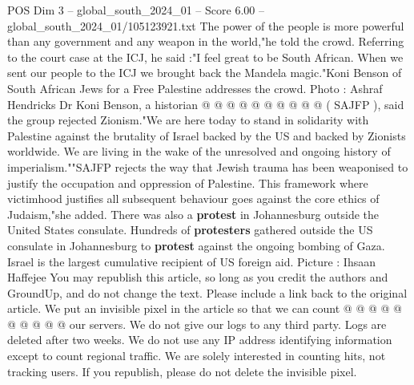 \begin{textsample}{POS Dim 3 – global\_south\_2024\_01 – Score 6.00 – global\_south\_2024\_01/105123921.txt}
The power of the people is more powerful than any government and any weapon in the world,"he told the crowd.
Referring to the court case at the ICJ, he said :"I feel great to be South African.
When we sent our people to the ICJ we brought back the Mandela magic."Koni Benson of South African Jews for a Free Palestine addresses the crowd.
Photo : Ashraf Hendricks Dr Koni Benson, a historian @ @ @ @ @ @ @ @ @ @ ( SAJFP ), said the group rejected Zionism."We are here today to stand in solidarity with Palestine against the brutality of Israel backed by the US and backed by Zionists worldwide.
We are living in the wake of the unresolved and ongoing history of imperialism.""SAJFP rejects the way that Jewish trauma has been weaponised to justify the occupation and oppression of Palestine.
This framework where victimhood justifies all subsequent behaviour goes against the core ethics of Judaism,"she added.
There was also a \textbf{protest} in Johannesburg outside the United States consulate.
Hundreds of \textbf{protesters} gathered outside the US consulate in Johannesburg to \textbf{protest} against the ongoing bombing of Gaza.
Israel is the largest cumulative recipient of US foreign aid.
Picture : Ihsaan Haffejee You may republish this article, so long as you credit the authors and GroundUp, and do not change the text.
Please include a link back to the original article.
We put an invisible pixel in the article so that we can count @ @ @ @ @ @ @ @ @ @ our servers.
We do not give our logs to any third party.
Logs are deleted after two weeks.
We do not use any IP address identifying information except to count regional traffic.
We are solely interested in counting hits, not tracking users.
If you republish, please do not delete the invisible pixel.

\end{textsample}

